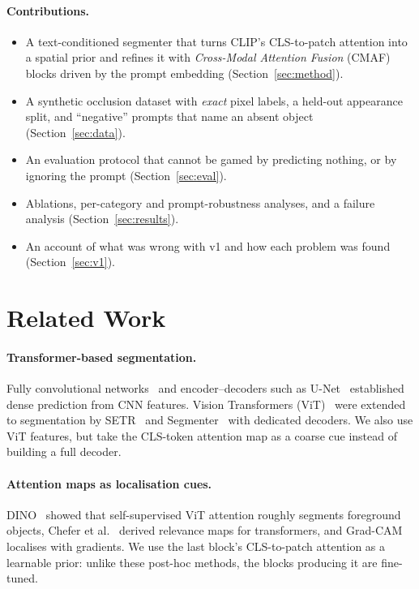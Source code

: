 \documentclass[11pt,a4paper]{article}
\begin{document}
\paragraph{Contributions.}
\begin{itemize}
  \item A text-conditioned segmenter that turns CLIP's CLS-to-patch attention into a spatial prior and
  refines it with \emph{Cross-Modal Attention Fusion} (CMAF) blocks driven by the prompt embedding
  (Section~\ref{sec:method}).
  \item A synthetic occlusion dataset with \emph{exact} pixel labels, a held-out appearance split, and
  ``negative'' prompts that name an absent object (Section~\ref{sec:data}).
  \item An evaluation protocol that cannot be gamed by predicting nothing, or by ignoring the prompt
  (Section~\ref{sec:eval}).
  \item Ablations, per-category and prompt-robustness analyses, and a failure analysis
  (Section~\ref{sec:results}).
  \item An account of what was wrong with v1 and how each problem was found
  (Section~\ref{sec:v1}).
\end{itemize}

\section{Related Work}

\paragraph{Transformer-based segmentation.}
Fully convolutional networks~\cite{long2015fcn} and encoder--decoders such as
U-Net~\cite{ronneberger2015unet} established dense prediction from CNN features. Vision Transformers
(ViT)~\cite{dosovitskiy2021vit} were extended to segmentation by SETR~\cite{zheng2021setr} and
Segmenter~\cite{strudel2021segmenter} with dedicated decoders. We also use ViT features, but take the
CLS-token attention map as a coarse cue instead of building a full decoder.

\paragraph{Attention maps as localisation cues.}
DINO~\cite{caron2021dino} showed that self-supervised ViT attention roughly segments foreground
objects, Chefer et al.~\cite{chefer2021interpretability} derived relevance maps for transformers, and
Grad-CAM~\cite{selvaraju2017gradcam} localises with gradients. We use the last block's CLS-to-patch
attention as a learnable prior: unlike these post-hoc methods, the blocks producing it are fine-tuned.
\end{document}
